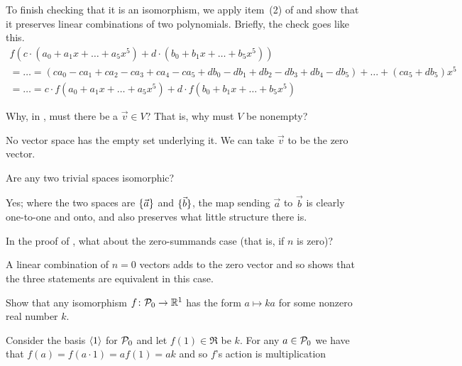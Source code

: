 \begin{exercises}
\begin{answer}
      To finish checking that it is an isomorphism, we apply  
      item~(2) of  and show 
      that it preserves linear combinations of two polynomials.
      Briefly, the check goes like this.
      \begin{multline*}
        f(c\cdot (a_0+a_1x+\dots +a_5x^5)+d\cdot (b_0+b_1x+\dots +b_5x^5))  \\
         =\dots=
         (ca_0-ca_1+ca_2-ca_3+ca_4-ca_5+db_0-db_1+db_2-db_3+db_4-db_5)
          +\dots+(ca_5+db_5)x^5                                 \\
         =\dots=
         c\cdot f(a_0+a_1x+\dots +a_5x^5)+d\cdot f(b_0+b_1x+\dots +b_5x^5)
      \end{multline*}
    \end{answer}
  \item  
    Why, in , must there be a
    \( \vec{v}\in V \)?
    That is, why must $V$ be nonempty?
     \begin{answer}
       No vector space has the empty set underlying it.   
       We can take $\vec{v}$ to be the zero vector.      
     \end{answer}
  \item  
     Are any two trivial spaces isomorphic?
     \begin{answer}
        Yes; where the two spaces are \( \mbox{$\{\vec{a}\}$} \) and
        \( \mbox{$\{\vec{b}\}$} \),
        the map sending \( \vec{a} \) to \( \vec{b} \) is clearly one-to-one
        and onto, and also preserves what little structure there is.  
      \end{answer}
  \item 
    In the proof of ,
    what about the zero-summands case (that is, if $n$ is zero)?
    \begin{answer}
       A linear combination of $n=0$ vectors adds to the zero vector and so
       shows that the three statements are equivalent in this case.
    \end{answer}
  \item 
    Show that any isomorphism \( \mbox{$f\colon \mathcal{P}_0\to \mathbb{R}^1$} \) has the
    form \( a\mapsto ka \) for some nonzero real number \( k \).
    \begin{answer}
      Consider the basis \( \langle1\rangle \) for \( \mathcal{P}_0 \)
      and let \( f(1)\in\Re \) be \( k \).
      For any \( a\in\mathcal{P}_0 \)
      we have that 
      \( f(a)=f(a\cdot 1)=af(1)=ak \) and so \( f \)'s action is multiplication

\end{answer}
\end{exercises}
